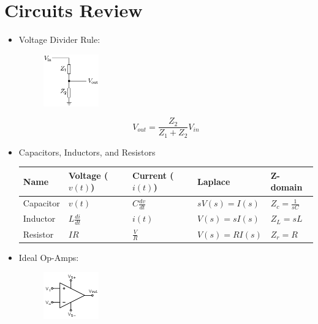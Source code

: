 \section{Circuits Review}

    \begin{itemize}
        \item Voltage Divider Rule:

            \begin{figure}[h]
                \centering
                \includegraphics[width=90px,keepaspectratio]{images/Impedance_Voltage_divider.png}
                \label{fig:voltage_divider_image}
            \end{figure}
            \[ V_{out} = \frac{Z_2}{Z_1 + Z_2} V_{in} \]

        \item Capacitors, Inductors, and Resistors

            \begin{table}[h]
                \centering
                \begin{tabular}{ | l || l | l | l | l | }
                    \hline
                    Name & Voltage ($v(t)$) & Current ($i(t)$) & Laplace & Z-domain \\ \hline \hline

                    Capacitor & $v(t)$ & $C \frac{dv}{dt}$ & $sV(s) = I(s)$ & $Z_c = \frac{1}{sC}$\\ \hline
                    Inductor & $L \frac{di}{dt}$ & $i(t)$ & $V(s) = sI(s)$ & $Z_L = sL$\\ \hline
                    Resistor & $IR$ & $\frac{V}{R}$ & $V(s) = RI(s)$ & $Z_r = R$\\ \hline
                \end{tabular}
            \end{table}

        \item Ideal Op-Amps:

            \begin{figure}[h]
                \centering
                \includegraphics[width=90px,keepaspectratio]{images/180px-Op-amp_symbol.png}
            \end{figure}


\end{itemize}

